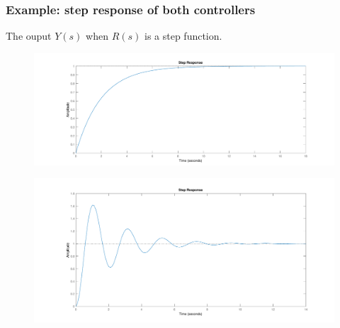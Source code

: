 \begin{frame}
	\frametitle{Example: step response of both controllers}
	The ouput $Y(s)$ when $R(s)$ is a step function.
	\begin{figure}
		\centering
		\includegraphics[width=0.7\columnwidth]{smooth-step}
		\label{fig:smooth-step}
	\end{figure}
	\vspace*{-1em}
	\begin{figure}
		\centering
		\includegraphics[width=0.7\columnwidth]{osc-step}
		\label{fig:osc-step}
	\end{figure}
\end{frame}

